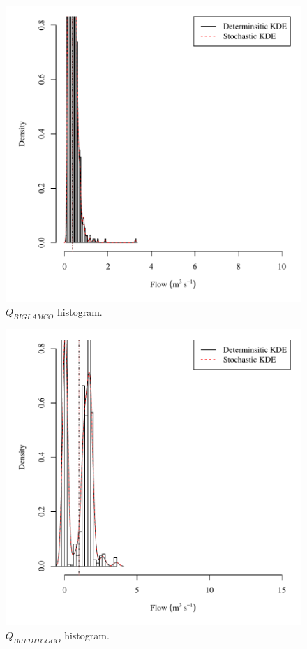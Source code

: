 \begin{center}
\begin{figure}[htbp]
	\includegraphics[width=6in]{"Figures/Results_DSR/V density qBIG"}
	\caption{$Q_{BIGLAMCO}$ histogram.}
\end{figure}
\end{center}
\newpage

\begin{center}
\begin{figure}[htbp]
	\includegraphics[width=6in]{"Figures/Results_DSR/V density qBUF"}
	\caption{$Q_{BUFDITCOCO}$ histogram.}
\end{figure}
\end{center}
\newpage

